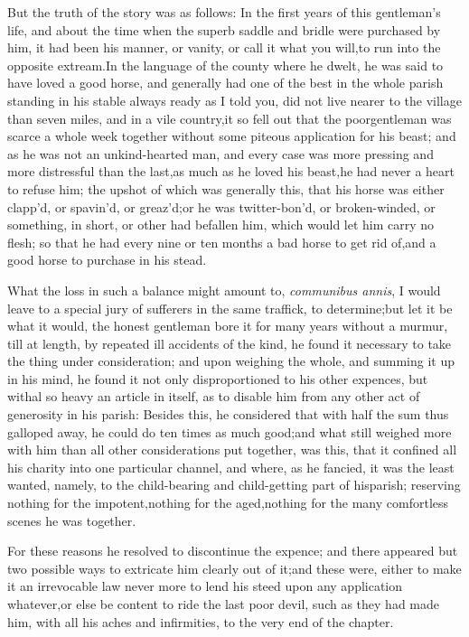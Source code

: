 \documentclass{article}
\begin{document}
\newpage
But the truth of the story was as follows: In the first years of
this gentleman’s life, and about the time when the superb saddle
and bridle were purchased by him, it had been his manner, or
vanity, or call it what you will,\tsk  to run into the opposite
extream.\tsk  In the language of the county where he dwelt, he
was said to have loved a good horse, and generally had one of
the best in the whole parish standing in his stable always ready
\break
as I told you, did not
live nearer to the village than seven miles, and in a vile
country,\tsh  it so fell out that the poor\break gentleman was scarce
a whole week together without some piteous application for his
beast; and as he was not an un\-kind-hearted man, and every case
was more pressing and more distressful than the last,\tsk  as
much as he loved his beast,\pb he had never a heart to refuse
him; the upshot of which was generally this, that his horse was
either clapp’d, or spavin’d, or greaz’d;\tsk  or he was
twitter-bon’d, or broken-winded, or something, in short, or
other had befallen him, which would let him carry no flesh;\tsk
so that he had every nine or ten months a bad horse to get rid
of,\tsk  and a good horse to purchase in his stead.

What the loss in such a balance might amount to, \textit{communibus
annis}, I would leave to a special jury of sufferers in the same traffick,
to determine;\tsk  but let it be what it would, the honest
gentleman bore it for many years without a murmur, till at length,
by repeated ill accidents of the kind, he found it necessary to
take the thing under consideration; and upon weighing the whole,
and summing it up in his mind, he found it not only disproportioned
to his other expences, but withal so heavy an article in itself, as
to disable him from any other act of generosity in his parish:
Besides this, he considered that with half the sum thus galloped
away, he could do ten times as much good;\tsk  and what still
weighed more with him than all other considerations put together,
was this, that it confined all his charity into one particular
channel, and where, as he fancied, it was the least wanted, namely,
to the child-bearing and child-getting part of his\break parish;
reserving nothing for the impotent,\tsk  nothing for the
aged,\tsk  nothing for the many comfortless scenes he was 
\break together.

\newpage
For these reasons he resolved to discontinue the expence; and
there appeared but two possible ways to extricate him clearly out
of it;\tsk  and these were, either to make it an irrevocable law
never more to lend his steed upon any application
whatever,\tsk  or else be content to ride the last poor devil,
such as they had made him, with all his aches and infirmities, to
the very end of the chapter.
\end{document}
